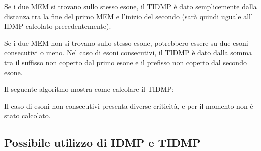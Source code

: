 Se i due MEM si trovano sullo stesso esone, il TIDMP è dato semplicemente dalla distanza tra la fine del primo MEM e l'inizio del secondo (sarà quindi uguale all' IDMP calcolato precedentemente).

Se i due MEM non si trovano sullo stesso esone, potrebbero essere su due esoni consecutivi o meno. Nel caso di esoni consecutivi, il TIDMP è dato dalla somma tra il suffisso non coperto dal primo esone e il prefisso non coperto dal secondo esone.

Il seguente algoritmo mostra come calcolare il TIDMP:



Il caso di esoni non consecutivi presenta diverse criticità, e per il momento non è stato calcolato.

\newpage

\subsection{Possibile utilizzo di IDMP e TIDMP}

\newpage